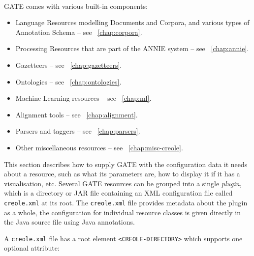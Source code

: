 
\mbox{ }

GATE comes with various built-in components:
%
\begin{itemize}
%
\item
Language Resources modelling Documents and Corpora, and various types of
Annotation Schema -- see \Chapthing\ \ref{chap:corpora}.
%
\item
Processing Resources that are part of the ANNIE system -- see \Chapthing\
\ref{chap:annie}.
%
%
\item 
Gazetteers -- see \Chapthing\
\ref{chap:gazetteers}.
\item
Ontologies -- see \Chapthing\
\ref{chap:ontologies}.
\item
Machine Learning resources -- see \Chapthing\
\ref{chap:ml}.
\item
Alignment tools -- see \Chapthing\
\ref{chap:alignment}.
\item
Parsers and taggers -- see \Chapthing\
\ref{chap:parsers}.
\item
Other miscellaneous resources -- see \Chapthing\ \ref{chap:misc-creole}.
\end{itemize}


This section describes how to supply GATE with the configuration data it needs
about a resource, such as what its parameters are, how to display it if it has
a visualisation, etc.  Several GATE resources can be grouped into a single
\emph{plugin}, which is a directory or JAR file containing an XML configuration file called
{\tt creole.xml} at its root.  The {\tt creole.xml} file provides metadata
about the plugin as a whole, the configuration for individual resource classes
is given directly in the Java source file using Java annotations.

A {\tt creole.xml} file has a root element \verb|<CREOLE-DIRECTORY>| which
supports one optional attribute:%

